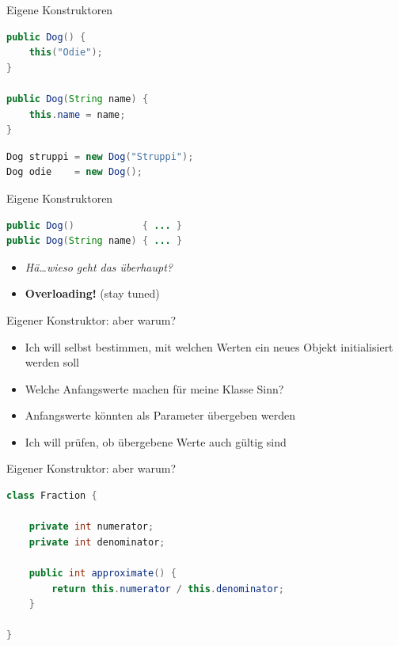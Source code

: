 \documentclass[18pt]{beamer}
\begin{document}
\begin{frame}[fragile]{Eigene Konstruktoren}
    \begin{exampleblock}{}
        \begin{lstlisting}[language=Java]
public Dog() {
    this("Odie");
}

public Dog(String name) {
    this.name = name;
}
        \end{lstlisting}
    \end{exampleblock}
    \begin{lstlisting}[language=Java]
Dog struppi = new Dog("Struppi");
Dog odie    = new Dog();
    \end{lstlisting}
\end{frame}

\begin{frame}[fragile]{Eigene Konstruktoren}
    \begin{exampleblock}{}
        \begin{lstlisting}[language=Java]
public Dog()            { ... }
public Dog(String name) { ... }
        \end{lstlisting}
    \end{exampleblock}
    \vspace{.2in}
    \begin{itemize}
        \item \textit{Hä\dots wieso geht das überhaupt?}
        \pause
        \item \textbf{Overloading!} (stay tuned)
    \end{itemize}
\end{frame}


\begin{frame}{Eigener Konstruktor: aber warum?}
    \begin{itemize}
        \item Ich will selbst bestimmen, mit welchen Werten ein neues Objekt initialisiert werden soll
        \item Welche Anfangswerte machen für meine Klasse Sinn?
        \item Anfangswerte könnten als Parameter übergeben werden
        \item Ich will prüfen, ob übergebene Werte auch gültig sind
    \end{itemize}
\end{frame}

\begin{frame}[fragile]{Eigener Konstruktor: aber warum?}
    \begin{exampleblock}{}
        \begin{lstlisting}[language=Java]
class Fraction {

    private int numerator;
    private int denominator;

    public int approximate() {
        return this.numerator / this.denominator;
    }

}
        \end{lstlisting}
    \end{exampleblock}
\end{frame}
\end{document}
